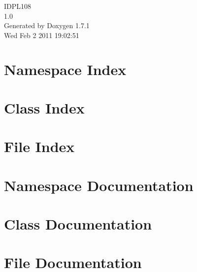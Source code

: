 \documentclass[a4paper]{book}
\begin{document}
\hypersetup{pageanchor=false}
\begin{titlepage}
\vspace*{7cm}
\begin{center}
{\Large IDPL108 \\[1ex]\large 1.0 }\\
\vspace*{1cm}
{\large Generated by Doxygen 1.7.1}\\
\vspace*{0.5cm}
{\small Wed Feb 2 2011 19:02:51}\\
\end{center}
\end{titlepage}
\clearemptydoublepage
{}
\tableofcontents
\clearemptydoublepage
{}
\hypersetup{pageanchor=true}
\chapter{Namespace Index}

\chapter{Class Index}

\chapter{File Index}

\chapter{Namespace Documentation}

\chapter{Class Documentation}








\chapter{File Documentation}















\printindex
\end{document}
